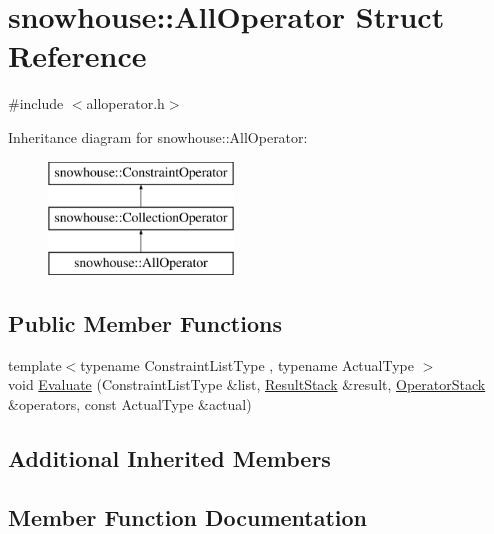 \hypertarget{structsnowhouse_1_1AllOperator}{}\section{snowhouse\+::All\+Operator Struct Reference}
\label{structsnowhouse_1_1AllOperator}


{\ttfamily \#include $<$alloperator.\+h$>$}

Inheritance diagram for snowhouse\+::All\+Operator\+:\begin{figure}[H]
\begin{center}
\leavevmode
\includegraphics[height=3.000000cm]{structsnowhouse_1_1AllOperator}
\end{center}
\end{figure}
\subsection*{Public Member Functions}
\begin{DoxyCompactItemize}
\item 
{\footnotesize template$<$typename Constraint\+List\+Type , typename Actual\+Type $>$ }\\void \mbox{\hyperlink{structsnowhouse_1_1AllOperator_a21e85e9a6a823b6d3ce1b5224c20916c}{Evaluate}} (Constraint\+List\+Type \&list, \mbox{\hyperlink{namespacesnowhouse_a719169b1315a13161c15f25e600a8f51}{Result\+Stack}} \&result, \mbox{\hyperlink{namespacesnowhouse_adcb10e215e6a4bbcb35722a9c7270fc6}{Operator\+Stack}} \&operators, const Actual\+Type \&actual)
\end{DoxyCompactItemize}
\subsection*{Additional Inherited Members}


\subsection{Member Function Documentation}
\mbox{\label{structsnowhouse_1_1AllOperator_a21e85e9a6a823b6d3ce1b5224c20916c}} 
